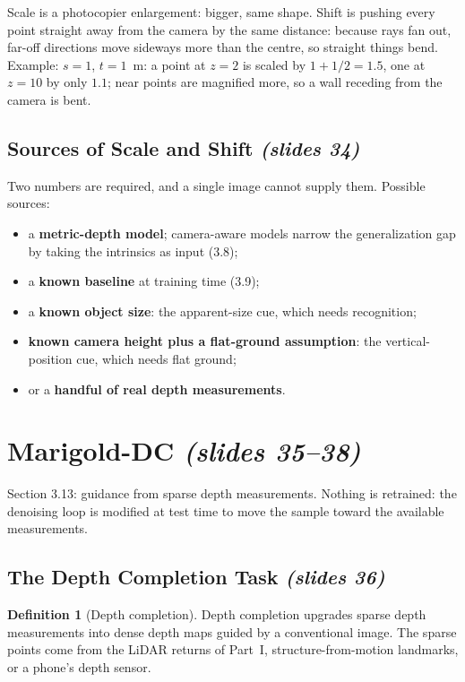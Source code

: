 \documentclass[11pt,a4paper]{article}
\newcommand{\slides}[1]{\texorpdfstring{\emph{(slides #1)}}{(slides #1)}}
\theoremstyle{plain}
\theoremstyle{definition}
\newtheorem{definition}[theorem]{Definition}
\numberwithin{equation}{section}
\begin{document}
\begin{intuition}
Scale is a photocopier enlargement: bigger, same shape. Shift is pushing every point straight away from the camera by the same distance: because rays fan out, far-off directions move sideways more than the centre, so straight things bend. Example: $s=1$, $t=1$~m: a point at $z=2$ is scaled by $1+1/2=1.5$, one at $z=10$ by only $1.1$; near points are magnified more, so a wall receding from the camera is bent.
\end{intuition}

\subsection{Sources of Scale and Shift \slides{34}}
Two numbers are required, and a single image cannot supply them. Possible sources:
\begin{itemize}[nosep]
 \item a \textbf{metric-depth model}; camera-aware models narrow the generalization gap by taking the intrinsics as input (3.8);
 \item a \textbf{known baseline} at training time (3.9);
 \item a \textbf{known object size}: the apparent-size cue, which needs recognition;
 \item \textbf{known camera height plus a flat-ground assumption}: the vertical-position cue, which needs flat ground;
 \item or a \textbf{handful of real depth measurements}.
\end{itemize}

\section{Marigold-DC \slides{35--38}}\label{sec:dc}
Section 3.13: guidance from sparse depth measurements. Nothing is retrained: the denoising loop is modified at test time to move the sample toward the available measurements.

\subsection{The Depth Completion Task \slides{36}}
\begin{definition}[Depth completion]
Depth completion upgrades sparse depth measurements into dense depth maps guided by a conventional image. The sparse points come from the LiDAR returns of Part~I, structure-from-motion landmarks, or a phone's depth sensor.
\end{definition}
\end{document}
